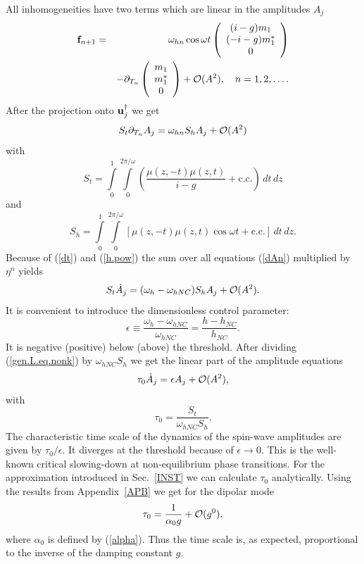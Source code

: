 All inhomogeneities have two terms which are linear in the amplitudes
$A_j$
\begin{eqnarray*}
  {\bf f}_{n+1}&=&\omega_{hn}\cos\omega t\left(\begin{array}{c}(i-g)
   m_1\\(-i-g)m_1^*\\0\end{array}\right)\\&&-\partial_{T_n}\left(
   \begin{array}{c}m_1\\m_1^*\\0\end{array}\right)+{\cal O}(A^2),
   \quad n=1,2,\ldots.
\end{eqnarray*}
After the projection onto ${\bf u}_j^\dagger$ we get
\begin{equation}
  S_t\partial_{T_n}A_j=\omega_{hn}S_hA_j+{\cal O}(A^2)
  \label{dAn}
\end{equation}
with
\begin{equation}
  S_t=\int\limits_0^1\int\limits_0^{2\pi/\omega}\left(\frac{\mu(z,-t)
   \mu(z,t)}{i-g}+\mbox{c.c.}\right)\,dt\,dz
  \label{St}
\end{equation}
and
\begin{equation}
  S_h=\int\limits_0^1\int\limits_0^{2\pi/\omega}[\mu(z,-t)\mu(z,t)
   \cos\omega t+\mbox{c.c.}]\,dt\,dz.
  \label{Sh}
\end{equation}
Because of (\ref{dt}) and (\ref{h.pow}) the sum over all equations 
(\ref{dAn}) multiplied by $\eta^n$ yields 
\begin{equation}
  S_t\dot{A}_j=(\omega_h-\omega_{hNC})S_hA_j+{\cal O}(A^2).
  \label{gen.L.eq.nonk}
\end{equation}
It is convenient to introduce the dimensionless control parameter:
\begin{equation}
  \epsilon\equiv\frac{\omega_h-\omega_{hNC}}{\omega_{hNC}}=
   \frac{h-h_{NC}}{h_{NC}}.
  \label{rel.com}
\end{equation}
It is negative (positive) below (above) the threshold.
After dividing (\ref{gen.L.eq.nonk}) by $\omega_{hNC}S_h$ we get the
linear part of the amplitude equations
\begin{equation}
  \tau_0\dot{A}_j=\epsilon A_j+{\cal O}(A^2),
  \label{gen.L.eq}
\end{equation}
with 
\begin{equation}
  \tau_0=\frac{S_t}{\omega_{hNC}S_h}.
  \label{tau}
\end{equation}
The characteristic time scale of the dynamics of the spin-wave
amplitudes are given by $\tau_0/\epsilon$. It diverges at the
threshold because of $\epsilon\to 0$. This is the well-known critical
slowing-down at non-equilibrium phase transitions. For the
approximation introduced in Sec.~\ref{INST} we can calculate
$\tau_0$ analytically. Using the results from Appendix~\ref{APB} we
get for the dipolar mode
\begin{equation}
  \tau_0=\frac{1}{\alpha_0g}+{\cal O}(g^0),
  \label{tau.exp}
\end{equation}
where $\alpha_0$ is defined by (\ref{alpha}). Thus the time scale is,
as expected, proportional to the inverse of the damping constant $g$.

